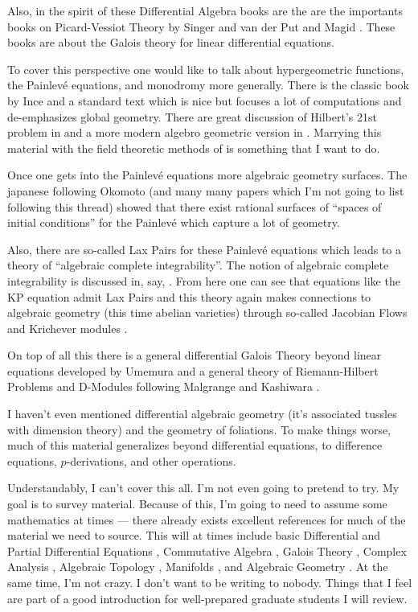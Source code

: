 \documentclass[12pt]{book}
\numberwithin{equation}{section}
\theoremstyle{definition}
\theoremstyle{remark}
\begin{document}
Also, in the spirit of these Differential Algebra books are the are the importants books on Picard-Vessiot Theory by Singer and van der Put \cite{Put2003} and Magid \cite{Magid1994}.
These books are about the Galois theory for linear differential equations.

To cover this perspective one would like to talk about hypergeometric functions, the Painlev\'{e} equations, and monodromy more generally. 
There is the classic book by Ince \cite{Ince1944} and a standard text \cite{Iwasaki1991} which is nice but focuses a lot of computations and de-emphasizes global geometry.
There are great discussion of Hilbert's 21st problem in \cite{Borel1987} and a more modern algebro geometric version in \cite{Deligne1970}.
Marrying this material with the field theoretic methods of \cite{Buium1986} is something that I want to do. 

Once one gets into the Painlev\'{e} equations more algebraic geometry surfaces. The japanese following  Okomoto \cite{Okamoto1987b,Okamoto1987,Okamoto1986, Okamoto1987a} (and many many papers which I'm not going to list following this thread) showed that there exist rational surfaces of ``spaces of initial conditions'' for the Painlev\'{e} which capture a lot of geometry. 

Also, there are so-called Lax Pairs for these Painlev\'{e} equations which leads to a theory of ``algebraic complete integrability''. 
The notion of algebraic complete integrability is discussed in, say, \cite{Beauville1990}\cite{Adler2004}. 
From here one can see that equations like the KP equation admit Lax Pairs and this theory again makes connections to algebraic geometry (this time abelian varieties) through so-called Jacobian Flows and Krichever modules \cite{Mulase1994}.

On top of all this there is a general differential Galois Theory beyond linear equations  developed by Umemura \cite{Umemura2011} and a general theory of Riemann-Hilbert  Problems and D-Modules following Malgrange and Kashiwara \cite{Borel1987}.

I haven't even mentioned differential algebraic geometry (it's associated tussles with dimension theory) and the geometry of foliations. To make things worse, much of this material generalizes beyond differential equations, to difference equations, $p$-derivations, and other operations.

Understandably, I can't cover this all. 
I'm not even going to pretend to try. 
My goal is to survey material.
Because of this, I'm going to need to assume some mathematics at times --- there already exists excellent references for much of the material we need to source.  
This will at times include basic Differential \cite{Ince1944} and Partial Differential Equations \cite{Evans2010}, Commutative Algebra \cite{Atiyah2016}, Galois Theory \cite{Cox2012}, Complex Analysis \cite{Ullrich2008}, Algebraic Topology \cite{Hatcher2002}, Manifolds \cite{Lee2013}, and Algebraic Geometry \cite{Vakil2017}. 
At the same time, I'm not crazy. 
I don't want to be writing to nobody. 
Things that I feel are part of a good introduction for well-prepared graduate students I will review. 
\end{document}
